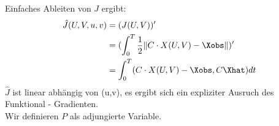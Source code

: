 \documentclass{article}
\begin{document}
Einfaches Ableiten von $J$ ergibt:
\begin{align*}
	\hat{J}(U,V,u,v)&= (J(U,V))'\\
									&= (\int_0^T \frac{1}{2} \|C\cdot X(U,V) - \Xobs \|)'\\
									&= \int_0^T (C\cdot X(U,V) - \Xobs ,C\Xhat)dt
\end{align*}
$\hat{J}$ ist linear abhängig von (u,v), es ergibt sich ein expliziter Ausruch des Funktional - Gradienten.\\
Wir definieren $P$ als adjungierte Variable.

 
\end{document}
